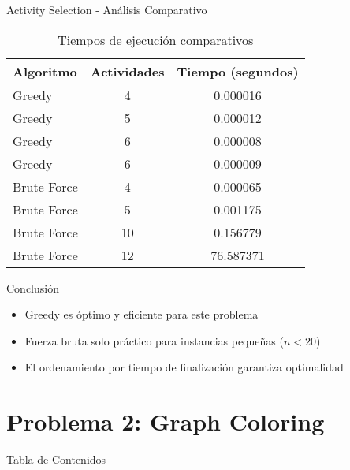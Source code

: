 \documentclass[aspectratio=169]{beamer}
\begin{document}
\begin{frame}{Activity Selection - Análisis Comparativo}

\begin{table}
\centering
\small
\begin{tabular}{lcc}
\toprule
\textbf{Algoritmo} & \textbf{Actividades} & \textbf{Tiempo (segundos)} \\
\midrule
Greedy & 4 & 0.000016 \\
Greedy & 5 & 0.000012 \\
Greedy & 6 & 0.000008 \\
Greedy & 6 & 0.000009 \\
Brute Force & 4 & 0.000065 \\
Brute Force & 5 & 0.001175 \\
Brute Force & 10 & 0.156779 \\
Brute Force & 12 & 76.587371 \\
\bottomrule
\end{tabular}
\caption{Tiempos de ejecución comparativos}
\end{table}

\scriptsize
\begin{block}{Conclusión}
\begin{itemize}

\item Greedy es óptimo y eficiente para este problema
\item Fuerza bruta solo práctico para instancias pequeñas ($n < 20$)
\item El ordenamiento por tiempo de finalización garantiza optimalidad
\end{itemize}
\end{block}
\end{frame}

\section{Problema 2: Graph Coloring}

\begin{frame}{Tabla de Contenidos}
\end{frame}
\end{document}
